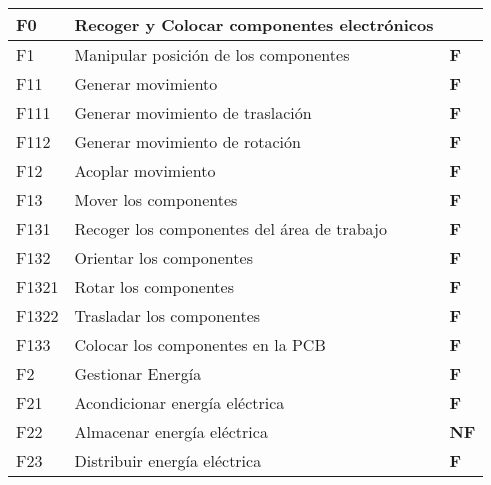   \begin{center}
  
  \tablelasttail{\hline}
  
    \begin{supertabular}{p{3em}p{15em}p{3em}}
    F0    & \textbf{Recoger y Colocar componentes electr\'onicos} &  \\
    \hline
    F1    & Manipular posici\'on de los componentes & \textbf{F} \\
    F11   & Generar movimiento & \textbf{F} \\
    F111  & Generar movimiento de traslaci\'on & \textbf{F} \\
    F112  & Generar movimiento de rotaci\'on & \textbf{F} \\
    F12   & Acoplar movimiento & \textbf{F} \\
    F13   & Mover los componentes & \textbf{F} \\
    F131  & Recoger los componentes del \'area de trabajo & \textbf{F} \\
    F132  & Orientar los componentes & \textbf{F} \\
    F1321 & Rotar los componentes & \textbf{F} \\
    F1322 & Trasladar los componentes & \textbf{F} \\
    F133  & Colocar los componentes en la PCB & \textbf{F} \\
    \hline
    F2    & Gestionar Energ\'ia & \textbf{F} \\
    F21   & Acondicionar energ\'ia el\'ectrica & \textbf{F} \\
    F22   & Almacenar energ\'ia el\'ectrica & \textbf{NF} \\
    F23   & Distribuir energ\'ia el\'ectrica & \textbf{F} \\

\end{supertabular}
\end{center}
